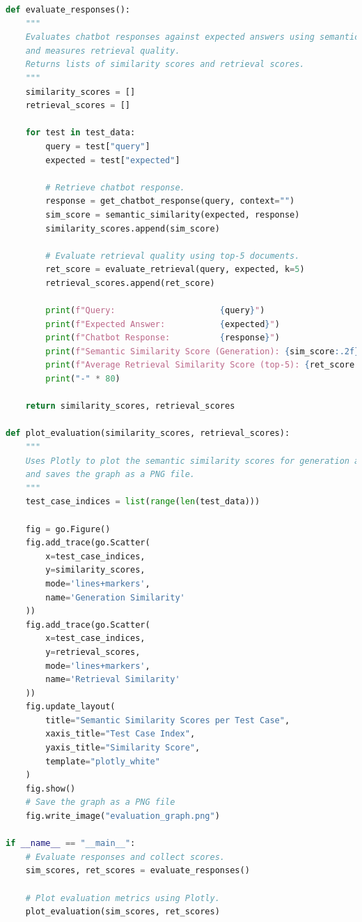 \begin{lstlisting}[language=Python, caption={Evaluation Code for Chatbot Responses and Retrieval Quality}, basicstyle=\small\ttfamily]
def evaluate_responses():
    """
    Evaluates chatbot responses against expected answers using semantic similarity,
    and measures retrieval quality.
    Returns lists of similarity scores and retrieval scores.
    """
    similarity_scores = []
    retrieval_scores = []
    
    for test in test_data:
        query = test["query"]
        expected = test["expected"]
        
        # Retrieve chatbot response.
        response = get_chatbot_response(query, context="")
        sim_score = semantic_similarity(expected, response)
        similarity_scores.append(sim_score)
        
        # Evaluate retrieval quality using top-5 documents.
        ret_score = evaluate_retrieval(query, expected, k=5)
        retrieval_scores.append(ret_score)
        
        print(f"Query:                     {query}")
        print(f"Expected Answer:           {expected}")
        print(f"Chatbot Response:          {response}")
        print(f"Semantic Similarity Score (Generation): {sim_score:.2f}")
        print(f"Average Retrieval Similarity Score (top-5): {ret_score:.2f}")
        print("-" * 80)
    
    return similarity_scores, retrieval_scores

def plot_evaluation(similarity_scores, retrieval_scores):
    """
    Uses Plotly to plot the semantic similarity scores for generation and retrieval,
    and saves the graph as a PNG file.
    """
    test_case_indices = list(range(len(test_data)))
    
    fig = go.Figure()
    fig.add_trace(go.Scatter(
        x=test_case_indices,
        y=similarity_scores,
        mode='lines+markers',
        name='Generation Similarity'
    ))
    fig.add_trace(go.Scatter(
        x=test_case_indices,
        y=retrieval_scores,
        mode='lines+markers',
        name='Retrieval Similarity'
    ))
    fig.update_layout(
        title="Semantic Similarity Scores per Test Case",
        xaxis_title="Test Case Index",
        yaxis_title="Similarity Score",
        template="plotly_white"
    )
    fig.show()
    # Save the graph as a PNG file
    fig.write_image("evaluation_graph.png")

if __name__ == "__main__":
    # Evaluate responses and collect scores.
    sim_scores, ret_scores = evaluate_responses()
    
    # Plot evaluation metrics using Plotly.
    plot_evaluation(sim_scores, ret_scores)
\end{lstlisting}

